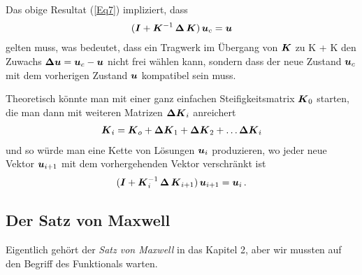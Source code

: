 \begin{remark}
Das obige Resultat (\ref{Eq7}) impliziert, dass
\begin{align}\label{Eq162}
(\mbox{\boldmath $I$} + \mbox{\boldmath $K$}^{-1}\,\mbox{\boldmath $\Delta$} \,\mbox{\boldmath $K$})\,\mbox{\boldmath $u$}_c = \mbox{\boldmath $u$}
\end{align}
gelten muss, was bedeutet, dass ein Tragwerk im \"{U}bergang von  $\mbox{\boldmath $K$}$ zu \vek K + \vek \Delta \vek K den Zuwachs $\mbox{\boldmath $\Delta$} \mbox{\boldmath $u$} = \mbox{\boldmath $u$}_c - \mbox{\boldmath $u$}$ nicht frei w\"{a}hlen kann, sondern dass der neue Zustand $\mbox{\boldmath $u$}_c$ mit dem vorherigen Zustand $\mbox{\boldmath $u$}$ kompatibel sein muss.

Theoretisch  k\"{o}nnte man mit einer ganz einfachen Steifigkeitsmatrix  $\mbox{\boldmath $K$}_0$ starten, die man dann mit weiteren Matrizen $\mbox{\boldmath $\Delta$} \mbox{\boldmath $K$}_i$ anreichert
\begin{align}
\mbox{\boldmath $K$}_i = \mbox{\boldmath $K$}_o + \mbox{\boldmath $\Delta$} \mbox{\boldmath $K$}_1 + \mbox{\boldmath $\Delta$} \mbox{\boldmath $K$}_2 + \ldots \mbox{\boldmath $\Delta$} \mbox{\boldmath $K$}_i
\end{align}
und so w\"{u}rde man eine Kette von L\"{o}sungen $\mbox{\boldmath $u$}_i$ produzieren, wo jeder neue Vektor $\mbox{\boldmath $u$}_{i + 1}$ mit dem vorhergehenden Vektor verschr\"{a}nkt ist
\begin{align}\label{Eq163}
(\mbox{\boldmath $I$} + \mbox{\boldmath $K$}_i^{-1}\,\mbox{\boldmath $\Delta$} \,\mbox{\boldmath $K$}_{i + 1})\,\mbox{\boldmath $u$}_{i + 1} = \mbox{\boldmath $u$}_i\,.
\end{align}
\end{remark}


{\textcolor{sectionTitleBlue}{\section{Der Satz von Maxwell}}}\label{Maxwell}
Eigentlich geh\"{o}rt der {\em Satz von Maxwell\/} in das Kapitel 2, aber wir mussten auf den Begriff des Funktionals warten.


